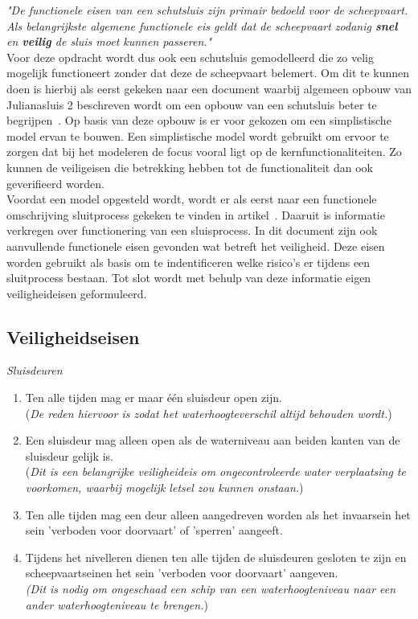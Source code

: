 \documentclass{article}
\begin{document}
    \textit{"De functionele eisen van een schutsluis zijn primair bedoeld voor de scheepvaart.}
    \textit{Als belangrijkste algemene functionele eis geldt dat de scheepvaart zodanig \textbf{snel} en 
    \textbf{veilig} de sluis moet kunnen passeren."} \\

    \noindent Voor deze opdracht wordt dus ook een schutsluis gemodelleerd die zo velig mogelijk functioneert zonder dat deze de scheepvaart belemert.
    Om dit te kunnen doen is hierbij als eerst gekeken naar een document waarbij algemeen 
    opbouw van Julianasluis 2 beschreven wordt om een opbouw van een schutsluis beter te begrijpen~\cite{bedienininstructie}. 
    Op basis van deze opbouw is er voor gekozen om een simplistische model ervan te bouwen. 
    Een simplistische model wordt gebruikt om ervoor te zorgen dat bij het modeleren de focus 
    vooral ligt op de kernfunctionaliteiten. Zo kunnen de veiligeisen die betrekking hebben 
    tot de functionaliteit dan ook geverifieerd worden. \\
    
    \noindent Voordat een model opgesteld wordt, wordt er als 
    eerst naar een functionele omschrijving sluitprocess gekeken te vinden in artikel~\cite{functioneel}. 
    Daaruit is informatie verkregen over functionering van een sluisprocess. In dit
    document zijn ook aanvullende functionele eisen gevonden wat betreft het 
    veiligheid. Deze eisen worden gebruikt als basis om te indentificeren welke 
    risico's er tijdens een sluitprocess bestaan. Tot slot wordt met behulp van
    deze informatie eigen veiligheideisen geformuleerd.
    
    \newpage
    \subsection{Veiligheidseisen}
        \textit{Sluisdeuren}
        \begin{enumerate} 
            \item Ten alle tijden mag er maar één sluisdeur open zijn. \\
            (\textit{De reden hiervoor is zodat het waterhoogteverschil altijd behouden wordt.})
            \item Een sluisdeur mag alleen open als de waterniveau aan beiden 
            kanten van de sluisdeur gelijk is. \\
            (\textit{Dit is een belangrijke veiligheideis om ongecontroleerde water verplaatsing te voorkomen, waarbij mogelijk letsel zou kunnen onstaan.})
            \item Ten alle tijden mag een deur alleen aangedreven worden als het
            invaarsein het sein 'verboden voor doorvaart' of 'sperren' aangeeft.
            \item Tijdens het nivelleren dienen ten alle tijden de sluisdeuren 
            gesloten te zijn en scheepvaartseinen het sein 'verboden voor doorvaart'
            aangeven. \\
            \textit{(Dit is nodig om ongeschaad een schip van een waterhoogteniveau naar een ander
            waterhoogteniveau te brengen.})
        \end{enumerate}
\end{document}
